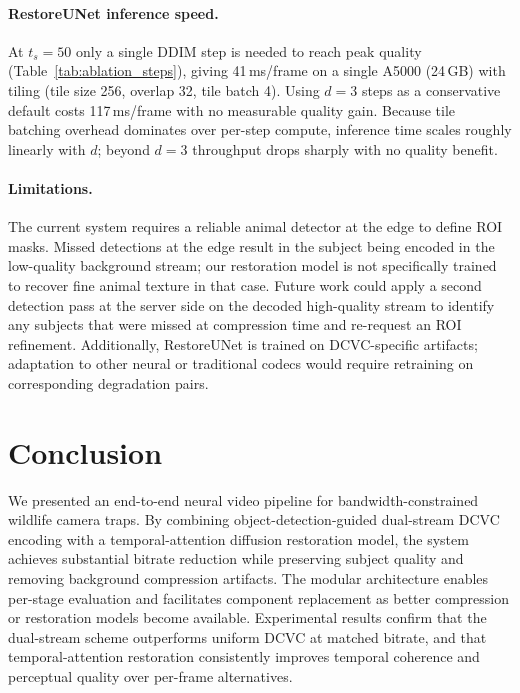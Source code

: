 \documentclass[10pt, conference]{IEEEtran}
\begin{document}
\paragraph{RestoreUNet inference speed.}
At $t_s{=}50$ only a single DDIM step is needed to reach peak quality (Table~\ref{tab:ablation_steps}), giving 41\,ms/frame on a single A5000 (24\,GB) with tiling (tile size 256, overlap 32, tile batch 4). Using $d{=}3$ steps as a conservative default costs 117\,ms/frame with no measurable quality gain. Because tile batching overhead dominates over per-step compute, inference time scales roughly linearly with $d$; beyond $d{=}3$ throughput drops sharply with no quality benefit.

\paragraph{Limitations.}
The current system requires a reliable animal detector at the edge to define ROI masks. Missed detections at the edge result in the subject being encoded in the low-quality background stream; our restoration model is not specifically trained to recover fine animal texture in that case. Future work could apply a second detection pass at the server side on the decoded high-quality stream to identify any subjects that were missed at compression time and re-request an ROI refinement. Additionally, RestoreUNet is trained on DCVC-specific artifacts; adaptation to other neural or traditional codecs would require retraining on corresponding degradation pairs.

\section{Conclusion}

We presented an end-to-end neural video pipeline for bandwidth-constrained wildlife camera traps. By combining object-detection-guided dual-stream DCVC encoding with a temporal-attention diffusion restoration model, the system achieves substantial bitrate reduction while preserving subject quality and removing background compression artifacts. The modular architecture enables per-stage evaluation and facilitates component replacement as better compression or restoration models become available. Experimental results confirm that the dual-stream scheme outperforms uniform DCVC at matched bitrate, and that temporal-attention restoration consistently improves temporal coherence and perceptual quality over per-frame alternatives.




\end{document}
